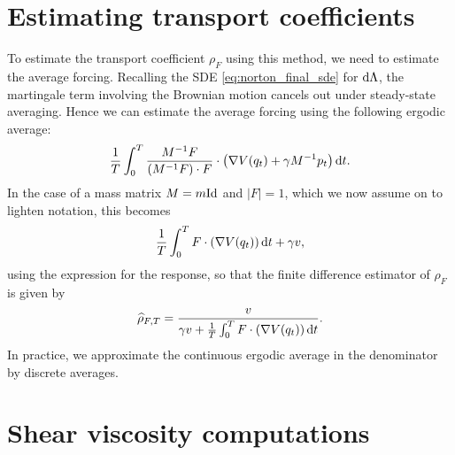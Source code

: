 \section{Estimating transport coefficients}
To estimate the transport coefficient $\rho_F$ using this method, we need to estimate the average forcing. Recalling the SDE \eqref{eq:norton_final_sde} for $\mathrm{d} \Lambda$, the martingale term involving the Brownian motion cancels out under steady-state averaging.
Hence we can estimate the average forcing using the following ergodic average:
\begin{equation}
    \label{eq:norton_ergodic_forcing}
    \frac{1}T\int_0^T\frac{M^{-1}F}{\left(M^{-1}F\right)\cdot F}\cdot\left(\nabla V(q_t)+\gamma M^{-1}p_t\right)\mathrm{d} t.
\end{equation}
In the case of a mass matrix $M=m\mathrm{Id}$ and $|F|=1$, which we now assume on to lighten notation, this becomes
\begin{equation}
    \label{eq:norton_ergodic_forcing_homogeneous}
    \frac{1}{T}\int_0^T F\cdot\left(\nabla V(q_t)\right)\mathrm{d} t + \gamma v,
\end{equation}
using the expression for the response, so that the finite difference estimator of $\rho_F$ is given by
\begin{equation}
    \label{eq:norton_transport estimator}
    \widehat{\rho}_{F,T}=\frac{v}{\gamma v+\frac{1}{T}\int_0^T F\cdot\left(\nabla V(q_t)\right)\mathrm{d} t}.
\end{equation}
In practice, we approximate the continuous ergodic average in the denominator by discrete averages.

\section{Shear viscosity computations}

